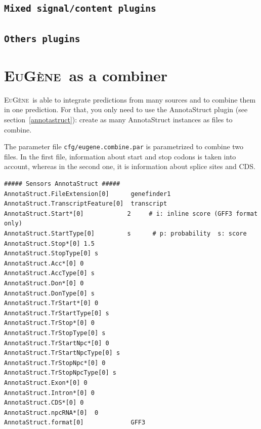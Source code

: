 \documentclass[a4paper,titlepage]{report}
\newcommand{\EuGene}{\textsc{EuG\`ene}}
\begin{document}
\subsection{\texttt{Mixed signal/content plugins}}





\subsection{\texttt{Others plugins}}





\section{\EuGene\ as a combiner}

\EuGene\ is able to integrate predictions from many sources and to combine them in one prediction.
For that, you only need to use the AnnotaStruct plugin (see section~\ref{annotastruct}): create as many AnnotaStruct instances as files to combine.


The parameter file \texttt{cfg/eugene.combine.par} is parametrized to combine two files. 
In the first file, information about start and stop codons is taken into account, whereas in the second one, it is information about splice sites and CDS.
\begin{Verbatim}[fontsize=\small]
 ##### Sensors AnnotaStruct #####
AnnotaStruct.FileExtension[0]      genefinder1
AnnotaStruct.TranscriptFeature[0]  transcript
AnnotaStruct.Start*[0]            2     # i: inline score (GFF3 format only) 
AnnotaStruct.StartType[0]         s      # p: probability  s: score
AnnotaStruct.Stop*[0] 1.5
AnnotaStruct.StopType[0] s
AnnotaStruct.Acc*[0] 0
AnnotaStruct.AccType[0] s
AnnotaStruct.Don*[0] 0
AnnotaStruct.DonType[0] s
AnnotaStruct.TrStart*[0] 0
AnnotaStruct.TrStartType[0] s
AnnotaStruct.TrStop*[0] 0
AnnotaStruct.TrStopType[0] s
AnnotaStruct.TrStartNpc*[0] 0
AnnotaStruct.TrStartNpcType[0] s
AnnotaStruct.TrStopNpc*[0] 0
AnnotaStruct.TrStopNpcType[0] s
AnnotaStruct.Exon*[0] 0
AnnotaStruct.Intron*[0] 0
AnnotaStruct.CDS*[0] 0
AnnotaStruct.npcRNA*[0]  0
AnnotaStruct.format[0]             GFF3
\end{Verbatim}
\end{document}

